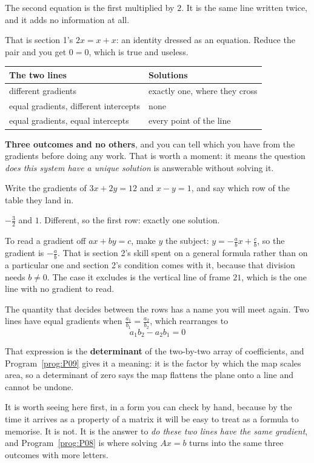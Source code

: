 \begin{fr}
The second equation is the first multiplied by $2$. It is the same line
written twice, and it adds no information at all.

That is section 1's $2x = x + x$: an identity dressed as an equation. Reduce
the pair and you get $0 = 0$, which is true and useless.

\begin{center}
\begin{tabular}{ll}
\toprule
The two lines & Solutions \\
\midrule
different gradients & exactly one, where they cross \\
equal gradients, different intercepts & none \\
equal gradients, equal intercepts & every point of the line \\
\bottomrule
\end{tabular}
\end{center}

\textbf{Three outcomes and no others}, and you can tell which you have from
the gradients before doing any work. That is worth a moment: it means the
question \emph{does this system have a unique solution} is answerable without
solving it.

Write the gradients of $3x + 2y = 12$ and $x - y = 1$, and say which row of
the table they land in.
\nextframe
\end{fr}

\begin{fr}
\begin{ansblock}
$-\frac{3}{2}$ and $1$. Different, so the first row: exactly one solution.
\end{ansblock}

To read a gradient off $ax + by = c$, make $y$ the subject:
$y = -\frac{a}{b}x + \frac{c}{b}$, so the gradient is $-\frac{a}{b}$. That is
section 2's skill spent on a general formula rather than on a particular one
\dash{} and section 2's condition comes with it, because that division needs
$b \ne 0$. The case it excludes is the vertical line of frame $21$, which is
the one line with no gradient to read.

The quantity that decides between the rows has a name you will meet again.
Two lines have equal gradients when $\frac{a_1}{b_1} = \frac{a_2}{b_2}$, which
rearranges to
\[ a_1 b_2 - a_2 b_1 = 0 \]

\begin{aibox}
That expression is the \textbf{determinant} of the two-by-two array of
coefficients, and Program~\ref{prog:P09} gives it a meaning: it is the factor
by which the map scales area, so a determinant of zero says the map flattens
the plane onto a line and cannot be undone.

It is worth seeing here first, in a form you can check by hand, because by the
time it arrives as a property of a matrix it will be easy to treat as a
formula to memorise. It is not. It is the answer to \emph{do these two lines
have the same gradient}, and Program~\ref{prog:P08} is where solving
$Ax = b$ turns into the same three outcomes with more letters.
\end{aibox}
\end{fr}

